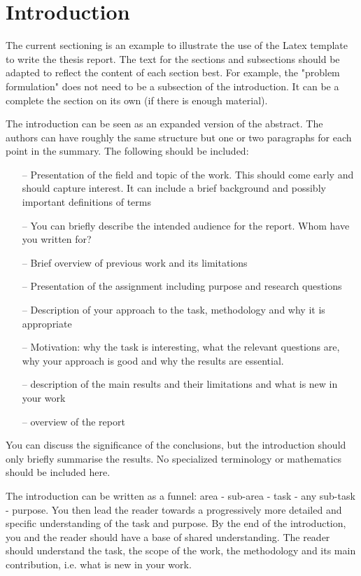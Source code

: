 \section{Introduction}
\label{sec:intro}

The current sectioning is an example to illustrate the use of the Latex template to write the thesis report. The text for the sections and subsections should be adapted to reflect the content of each section best. For example, the "problem formulation" does not need to be a subsection of the introduction. It can be a complete
the section on its own (if there is enough material). 

The introduction can be seen as an expanded version of the abstract. The authors can have roughly the same structure but one or two paragraphs for each point in the summary. The following should be included:
\begin{itemize}
\item[--] Presentation of the field and topic of the work. This should come early and should capture interest. It can include a brief background and possibly important definitions of terms
\item[--] You can briefly describe the intended audience for the report. Whom have you written for?
\item[--] Brief overview of previous work and its limitations 
\item[--] Presentation of the assignment including purpose and research questions
\item[--] Description of your approach to the task, methodology and why it is appropriate
\item[--] Motivation: why the task is interesting, what the relevant questions are, why your approach is good and why the results are essential.
\item[--] description of the main results and their limitations and what is new in your work
\item[--] overview of the report
\end{itemize}

You can discuss the significance of the conclusions, but the introduction should only briefly summarise the results. No specialized terminology or mathematics should be included here. 

The introduction can be written as a funnel: area - sub-area - task - any sub-task - purpose. You then lead the reader towards a progressively more detailed and specific understanding of the task and purpose. By the end of the introduction, you and the reader should have a base of shared understanding. The reader should understand the task, the scope of the work, the methodology and its main contribution, i.e. what is new in your work. 


